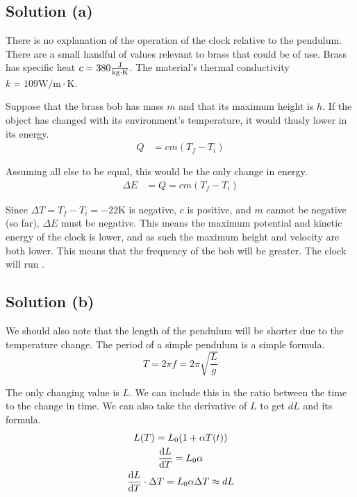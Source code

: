 \documentclass[12pt]{article}
\begin{document}
        \subsection{Solution (a)}
            There is no explanation of the operation of the clock relative to the pendulum.
            There are a small handful of values relevant to brass that could be of use.
            Brass has specific heat $c = 380 \unit{\frac{\joule}{\kilo\gram\cdot\kelvin}}$. 
            The material's thermal conductivity $k = 109 \unit{\watt/\meter\cdot\kelvin}$. 

            Suppose that the brass bob has mass $m$ and that its maximum height is $h$. 
            If the object has changed with its environment's temperature, it would thusly lower in its energy.
            \begin{align}
                Q   &=  cm (T_f - T_i)
            \end{align}

            Assuming all else to be equal, this would be the only change in energy.
            \begin{align}
                \Delta E    &=  Q
                    =   cm (T_f - T_i)
            \end{align}

            Since $\Delta T = T_f - T_i = -22 \unit{\kelvin}$ is negative, $c$ is positive, and $m$ cannot be negative (so far), $\Delta E$ must be negative.
            This means the maximum potential and kinetic energy of the clock is lower, and as such the maximum height and velocity are both lower.
            This means that the frequency of the bob will be greater.
            The clock will run . 

        \subsection{Solution (b)}
            We should also note that the length of the pendulum will be shorter due to the temperature change. 
            The period of a simple pendulum is a simple formula.
            \begin{equation}
                T   =   2\pi f = 2\pi \sqrt{\frac{L}{g}}
            \end{equation}

            The only changing value is $L$.
            We can include this in the ratio between the time to the change in time.
            We can also take the derivative of $L$ to get $dL$ and its formula.
            \begin{gather}
                L(T)    =   L_0 (1 + \alpha T(t))\\
                \dv{L}{T}   =   L_0 \alpha\\
                \dv{L}{T} \cdot \Delta T    =   L_0 \alpha \Delta T \approx dL
            \end{gather}
\end{document}
